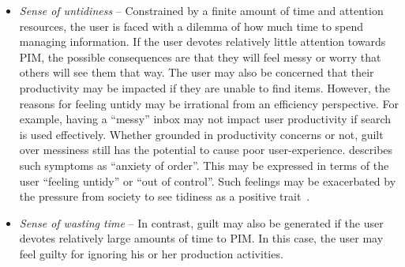 \begin{itemize}

\item \textit{Sense of untidiness} -- Constrained by a finite amount of time and attention resources, the user is faced with a dilemma of how much time to spend managing information.  If the user devotes relatively little attention towards PIM, the possible consequences are that they will feel messy or worry that others will see them that way.  The user may also be concerned that their productivity may be impacted if they are unable to find items.  However, the reasons for feeling untidy may be irrational from an efficiency perspective.  For example, having a ``messy'' inbox may not impact user productivity if search is used effectively.  Whether grounded in productivity concerns or not, guilt over messiness still has the potential to cause poor user-experience.  \citet{levy:01} describes such symptoms as ``anxiety of order''. This may be expressed in terms of the user ``feeling untidy'' or ``out of control''.  Such feelings may be exacerbated by the pressure from society to see tidiness as a positive trait~\citep{Economist:03}. %



\item \textit{Sense of wasting time} -- In contrast, guilt may also be generated if the user devotes relatively large amounts of time to PIM.  In this case, the user may feel guilty for ignoring his or her production activities.  %


\end{itemize}

